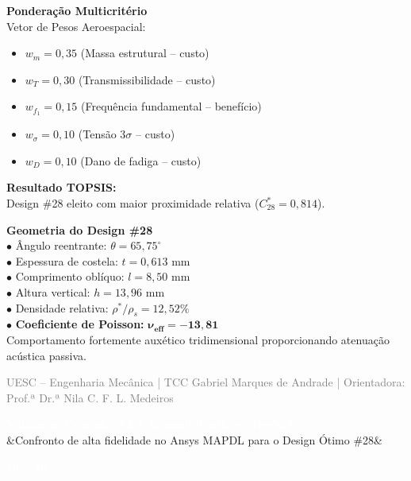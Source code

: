 \documentclass[11pt]{article}
\newcommand{\slideheader}[3]{
    \noindent
    \begin{minipage}{\textwidth}
        \colorbox{SpaceNavy}{
            \parbox{\dimexpr\textwidth-2\fboxsep\relax}{
                \vspace{0.2cm}
                \hspace{0.3cm}
                \begin{minipage}{0.85\textwidth}
                    {\Large \textbf{\textcolor{white}{#1}}}\\[0.1cm]
                    \ifx&#2&\else{\small \textbf{\textcolor{SpaceGold}{#2}}}\fi
                \end{minipage}
                \hfill
                \begin{minipage}{0.10\textwidth}
                    \raggedleft
                    {\large \textbf{\textcolor{white}{#3 / 20}}}\hspace{0.3cm}
                \end{minipage}
                \vspace{0.2cm}
            }
        }
    \end{minipage}
    \vspace{0.4cm}
}
\newcommand{\slidefooter}{
    \vfill
    \noindent
    \begin{minipage}{\textwidth}
        \centering
        \scriptsize \textcolor{gray}{UESC -- Engenharia Mecânica | TCC Gabriel Marques de Andrade | Orientadora: Prof.ª Dr.ª Nila C. F. L. Medeiros}
    \end{minipage}
}
\begin{document}
\begin{minipage}[t]{0.48\textwidth}
    \textbf{\textcolor{NavyAccent}{Ponderação Multicritério}}\\[0.2cm]
    \small
    Vetor de Pesos Aeroespacial:
    \begin{itemize}
        \item $w_m = 0{,}35$ (Massa estrutural -- custo)
        \item $w_T = 0{,}30$ (Transmissibilidade -- custo)
        \item $w_{f_1} = 0{,}15$ (Frequência fundamental -- benefício)
        \item $w_{\sigma} = 0{,}10$ (Tensão $3\sigma$ -- custo)
        \item $w_D = 0{,}10$ (Dano de fadiga -- custo)
    \end{itemize}
    \textbf{Resultado TOPSIS:}\\
    Design \#28 eleito com maior proximidade relativa ($C_{28}^* = 0{,}814$).
\end{minipage}
\hfill
\begin{minipage}[t]{0.48\textwidth}
    \textbf{\textcolor{NavyAccent}{Geometria do Design \#28}}\\[0.2cm]
    \small
    $\bullet$ Ângulo reentrante: $\theta = 65{,}75^\circ$\\
    $\bullet$ Espessura de costela: $t = 0{,}613\text{ mm}$\\
    $\bullet$ Comprimento oblíquo: $l = 8{,}50\text{ mm}$\\
    $\bullet$ Altura vertical: $h = 13{,}96\text{ mm}$\\
    $\bullet$ Densidade relativa: $\rho^* / \rho_s = 12{,}52\%$\\
    $\bullet$ \textbf{Coeficiente de Poisson:} $\mathbf{\nu_{\text{eff}} = -13{,}81}$\\[0.2cm]
    Comportamento fortemente auxético tridimensional proporcionando atenuação acústica passiva.
\end{minipage}

\slidefooter
\clearpage

\slideheader{Validação Cruzada: FEA Ground Truth vs. ResNet}{Confronto de alta fidelidade no Ansys MAPDL para o Design Ótimo \#28}{16}
\end{document}
